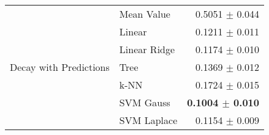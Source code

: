 \documentclass[10pt]{article}
\begin{document}
\begin{table}[H]
\begin{tabular}{llr}
    \hline
    \multirow{7}{*}{Decay with Predictions} & Mean Value   & 0.5051 $\pm$ 0.044 \\
                               & Linear       & 0.1211 $\pm$ 0.011 \\
                               & Linear Ridge & 0.1174 $\pm$ 0.010 \\
                               & Tree         & 0.1369 $\pm$ 0.012 \\
                               & k-NN         & 0.1724 $\pm$ 0.015 \\
                               & SVM Gauss    & \textbf{0.1004 $\pm$ 0.010} \\
                               & SVM Laplace  & 0.1154 $\pm$ 0.009 \\
    \hline\hline
  \end{tabular}
  \label{tab:gapresults}
\end{table}







\end{document}
